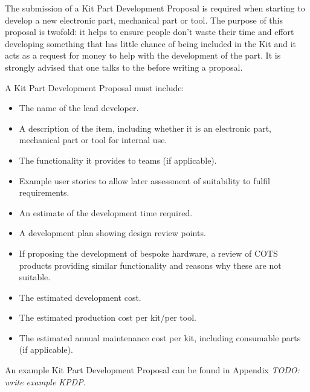 \begin{draft}
The submission of a Kit Part Development Proposal is required when starting to develop a new electronic part, mechanical part or tool. The purpose of this proposal is twofold: it helps to ensure people don't waste their time and effort developing something that has little chance of being included in the Kit and it acts as a request for money to help with the development of the part. It is strongly advised that one talks to the  before writing a proposal.

A Kit Part Development Proposal must include:
\begin{itemize}
  \item The name of the lead developer.
  \item A description of the item, including whether it is an electronic part, mechanical part or tool for internal use.
  \item The functionality it provides to teams (if applicable).
  \item Example user stories to allow later assessment of suitability to fulfil requirements.
  \item An estimate of the development time required.
  \item A development plan showing design review points.
  \item If proposing the development of bespoke hardware, a review of COTS products providing similar functionality and reasons why these are not suitable.
  \item The estimated development cost.
  \item The estimated production cost per kit/per tool.
  \item The estimated annual maintenance cost per kit, including consumable parts (if applicable).
\end{itemize}

An example Kit Part Development Proposal can be found in Appendix \emph{TODO: write example KPDP}.


\end{draft}

